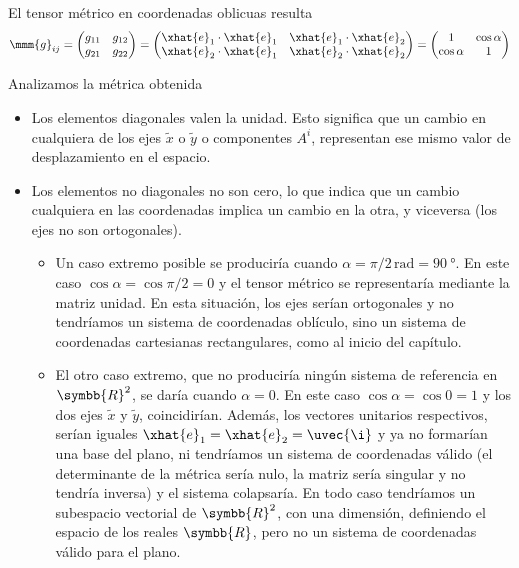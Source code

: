 El tensor métrico en coordenadas oblicuas resulta
\begin{equation}\label{eq:R2-oblic_metrica}
  \mmm{g}_{ij}
  = \begin{pmatrix}
    g_{11} & g_{12}\\
    g_{21} & g_{22}
    \end{pmatrix}
  = \begin{pmatrix}
      \xhat{e}_1\cdot\xhat{e}_1 & \xhat{e}_1\cdot\xhat{e}_2\\
      \xhat{e}_2\cdot\xhat{e}_1 & \xhat{e}_2\cdot\xhat{e}_2
  \end{pmatrix}
  = \begin{pmatrix}
    1 & \cos\alpha\\
    \cos\alpha & 1
  \end{pmatrix}
\end{equation}

Analizamos la métrica obtenida
\begin{itemize}
\item Los elementos diagonales valen la unidad. Esto significa que un cambio en
  cualquiera  de los ejes $\tilde{x}$ o $\tilde{y}$ o componentes $A^i$, representan ese
  mismo valor de desplazamiento en el espacio.
\item Los elementos no diagonales no son cero, lo que indica que un cambio cualquiera en
  las coordenadas implica un cambio en la otra, y viceversa (los ejes no son
  ortogonales).
  \begin{itemize}
  \item Un caso extremo posible se produciría cuando
    $\alpha = \pi/2\,\unit{\radian} = \qty{90}{\degree}$. En este caso
    $\cos\alpha = \cos\pi/2 = 0$ y el tensor métrico se representaría mediante la matriz
    unidad. En esta situación, los ejes serían ortogonales y no tendríamos un sistema de
    coordenadas oblículo, sino un sistema de coordenadas cartesianas rectangulares, como
    al inicio del capítulo.
  \item El otro caso extremo, que no produciría ningún sistema de referencia en
    $\symbb{R}^2$, se daría cuando $\alpha = 0$. En este caso $\cos\alpha = \cos 0 = 1$
    y los dos ejes $\tilde{x}$ y $\tilde{y}$, coincidirían. Además, los vectores
    unitarios respectivos, serían iguales $\xhat{e}_1 = \xhat{e}_2 = \uvec{\i}$ y ya no
    formarían una base del plano, ni tendríamos un sistema de coordenadas válido (el
    determinante de la métrica sería nulo, la matriz sería singular y no tendría
    inversa) y el sistema colapsaría. En todo caso tendríamos un subespacio vectorial de
    $\symbb{R}^2$, con una dimensión, definiendo el espacio de los reales $\symbb{R}$,
    pero no un sistema de coordenadas válido para el plano.
  \end{itemize}
\end{itemize}

